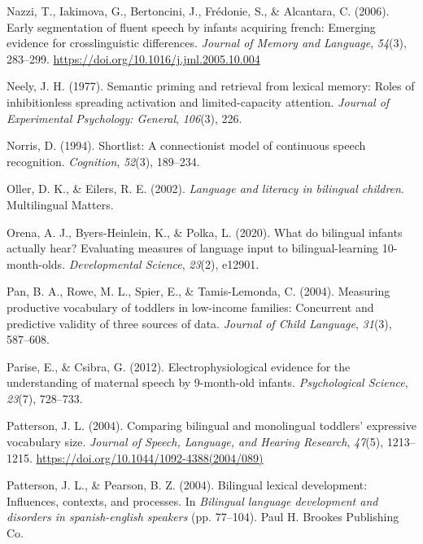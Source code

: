 \documentclass[
  12pt,
  b5paperpaper,
  twoside]{scrreprt}
\newlength{\cslhangindent}
\newlength{\cslentryspacingunit} %
\newenvironment{CSLReferences}[2] %
 {%
  \setlength{\parindent}{0pt}
  \ifodd #1
  \let\oldpar\par
  \def\par{\hangindent=\cslhangindent\oldpar}
  \fi
  \setlength{\parskip}{#2\cslentryspacingunit}
 }%
 {}
\begin{document}
\begin{CSLReferences}{1}{0}
\leavevmode{}%
Nazzi, T., Iakimova, G., Bertoncini, J., Frédonie, S., \& Alcantara, C.
(2006). Early segmentation of fluent speech by infants acquiring french:
Emerging evidence for crosslinguistic differences. \emph{Journal of
Memory and Language}, \emph{54}(3), 283--299.
\url{https://doi.org/10.1016/j.jml.2005.10.004}

\leavevmode{}%
Neely, J. H. (1977). Semantic priming and retrieval from lexical memory:
Roles of inhibitionless spreading activation and limited-capacity
attention. \emph{Journal of Experimental Psychology: General},
\emph{106}(3), 226.

\leavevmode{}%
Norris, D. (1994). Shortlist: A connectionist model of continuous speech
recognition. \emph{Cognition}, \emph{52}(3), 189--234.

\leavevmode{}%
Oller, D. K., \& Eilers, R. E. (2002). \emph{Language and literacy in
bilingual children}. Multilingual Matters.

\leavevmode{}%
Orena, A. J., Byers-Heinlein, K., \& Polka, L. (2020). What do bilingual
infants actually hear? Evaluating measures of language input to
bilingual-learning 10-month-olds. \emph{Developmental Science},
\emph{23}(2), e12901.

\leavevmode{}%
Pan, B. A., Rowe, M. L., Spier, E., \& Tamis-Lemonda, C. (2004).
Measuring productive vocabulary of toddlers in low-income families:
Concurrent and predictive validity of three sources of data.
\emph{Journal of Child Language}, \emph{31}(3), 587--608.

\leavevmode{}%
Parise, E., \& Csibra, G. (2012). Electrophysiological evidence for the
understanding of maternal speech by 9-month-old infants.
\emph{Psychological Science}, \emph{23}(7), 728--733.

\leavevmode{}%
Patterson, J. L. (2004). Comparing bilingual and monolingual toddlers'
expressive vocabulary size. \emph{Journal of Speech, Language, and
Hearing Research}, \emph{47}(5), 1213--1215.
\url{https://doi.org/10.1044/1092-4388(2004/089)}

\leavevmode{}%
Patterson, J. L., \& Pearson, B. Z. (2004). Bilingual lexical
development: Influences, contexts, and processes. In \emph{Bilingual
language development and disorders in spanish-english speakers} (pp.
77--104). Paul H. Brookes Publishing Co.


\end{CSLReferences}
\end{document}
